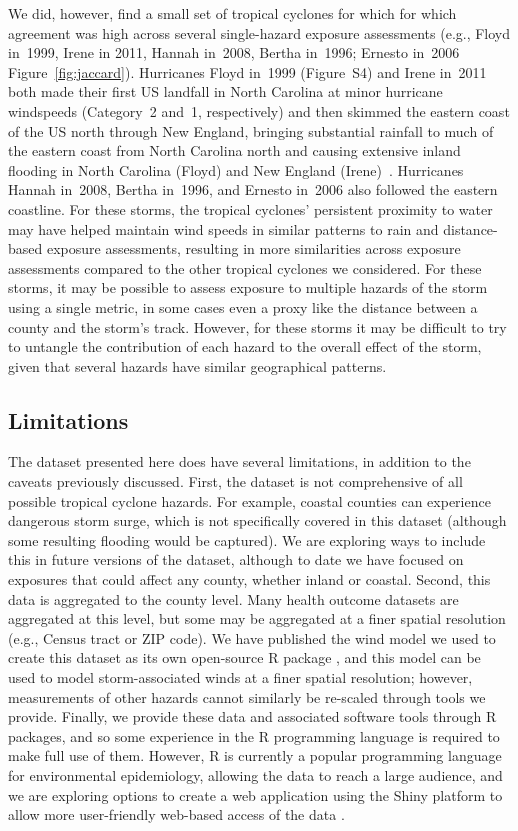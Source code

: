 We did, however, find a small set of tropical cyclones for which for
which agreement was high across several single-hazard exposure assessments
(e.g., Floyd in~1999, Irene in 2011, Hannah in~2008, Bertha in~1996; Ernesto
in~2006 Figure~\ref{fig:jaccard}).  Hurricanes Floyd in~1999 (Figure~S4) and
Irene in~2011 both made their first \ac{US} landfall in North Carolina at minor
hurricane windspeeds (Category~2 and~1, respectively) and then skimmed the
eastern coast of the \ac{US} north through New England, bringing substantial
rainfall to much of the eastern coast from North Carolina north and causing
extensive inland flooding in North Carolina (Floyd) and New England
(Irene)~\parencite{avila2013atlantic, lawrence2000atlantic}.  Hurricanes Hannah
in~2008, Bertha in~1996, and Ernesto in~2006 also followed the eastern
coastline. For these storms, the tropical cyclones' persistent proximity
to water may have helped maintain wind speeds in similar patterns to rain and
distance-based exposure assessments, resulting in more similarities across
exposure assessments compared to the other tropical cyclones we considered.
For these storms, it may be possible to assess exposure to multiple hazards of
the storm using a single metric, in some cases even a proxy like the distance
between a county and the storm's track.  However, for these storms it may be
difficult to try to untangle the contribution of each hazard to the overall
effect of the storm, given that several hazards have similar geographical
patterns. 

\subsection*{Limitations}

The dataset presented here does have several limitations, in addition to the
caveats previously discussed. First, the dataset is not comprehensive of all
possible tropical cyclone hazards. For example, coastal counties can experience
dangerous storm surge, which is not specifically covered in this dataset
(although some resulting flooding would be captured). We are exploring ways to
include this in future versions of the dataset, although to date we have
focused on exposures that could affect any county, whether inland or coastal.
Second, this data is aggregated to the county level. Many health outcome
datasets are aggregated at this level, but some may be aggregated at a finer
spatial resolution (e.g., Census tract or ZIP code). We have published the wind
model we used to create this dataset as its own open-source R package
\parencite{stormwindmodel}, and this model can be used to model
storm-associated winds at a finer spatial resolution; however, measurements of
other hazards cannot similarly be re-scaled through tools we provide. Finally,
we provide these data and associated software tools through R packages, and so
some experience in the R programming language is required to make full use of
them. However, R is currently a popular programming language for environmental
epidemiology, allowing the data to reach a large audience, and we are exploring
options to create a web application using the Shiny platform to allow more
user-friendly web-based access of the data \parencite{shiny2019}. 


